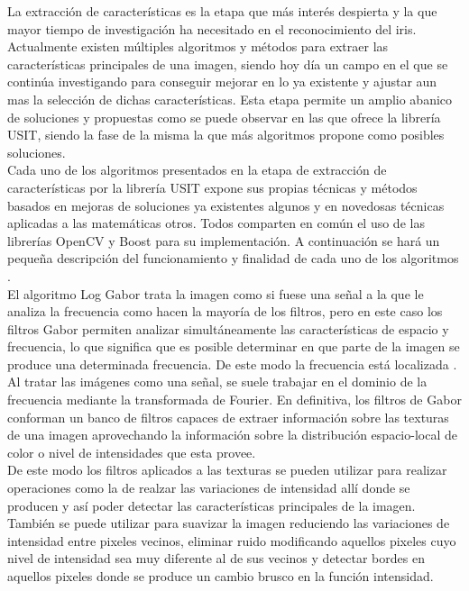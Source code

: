 La extracción de características es la etapa que más interés despierta y la que mayor tiempo de investigación ha necesitado en el reconocimiento del iris. Actualmente existen múltiples algoritmos y métodos para extraer las características principales de una imagen, siendo hoy día un campo en el que se continúa investigando para conseguir mejorar en lo ya existente y ajustar aun mas la selección de dichas características. Esta etapa permite un amplio abanico de soluciones y propuestas como se puede observar en las que ofrece la librería USIT, siendo la fase de la misma la que más algoritmos propone como posibles soluciones.\\

Cada uno de los algoritmos presentados en la etapa de extracción de características por la librería USIT expone sus propias técnicas y métodos basados en mejoras de soluciones ya existentes algunos y en novedosas técnicas aplicadas a las matemáticas otros. Todos comparten en común el uso de las librerías OpenCV y Boost para su implementación. A continuación se hará un pequeña descripción del funcionamiento y finalidad de cada uno de los algoritmos \cite{Reference18} \cite{Reference19}. \\

El algoritmo Log Gabor trata la imagen como si fuese una señal a la que le analiza la frecuencia como hacen la mayoría de los filtros, pero en este caso los filtros Gabor permiten analizar simultáneamente las características de espacio y frecuencia, lo que significa que es posible determinar en que parte de la imagen se produce una determinada frecuencia. De este modo la frecuencia está localizada \cite{Reference18} \cite{Reference19}. \\

Al tratar las imágenes como una señal, se suele trabajar en el dominio de la frecuencia mediante la transformada de Fourier. En definitiva, los filtros de Gabor conforman un banco de filtros capaces de extraer información sobre las texturas de una imagen aprovechando la información sobre la distribución espacio-local de color o nivel de intensidades que esta provee. \\

De este modo los filtros aplicados a las texturas se pueden utilizar para realizar operaciones como la de realzar las variaciones de intensidad allí donde se producen y así poder detectar las características principales de la imagen. También se puede utilizar para suavizar la imagen reduciendo las variaciones de intensidad entre pixeles vecinos, eliminar ruido modificando aquellos pixeles cuyo nivel de intensidad sea muy diferente al de sus vecinos y detectar bordes en aquellos pixeles donde se produce un cambio brusco en la función intensidad. \\

